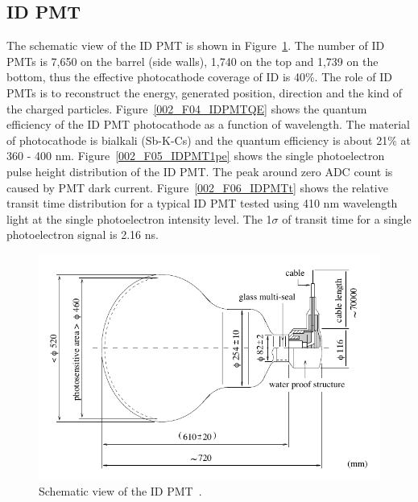\subsection{ID PMT}
\vs\hs The schematic view of the ID PMT is shown in Figure~\ref{002_F03_IDPMT}.
The number of ID PMTs is 7,650 on the barrel (side walls), 1,740 on the top and 1,739 on the bottom, thus the effective photocathode coverage of ID is 40\%.
The role of ID PMTs is to reconstruct the energy, generated position, direction and the kind of the charged particles.
Figure~\ref{002_F04_IDPMTQE} shows the quantum efficiency of the ID PMT photocathode as a function of wavelength.
The material of photocathode is bialkali (Sb-K-Cs) and the quantum efficiency is about 21\% at 360 - 400 nm.
Figure~\ref{002_F05_IDPMT1pe} shows the single photoelectron pulse height distribution of the ID PMT.
The peak around zero ADC count is caused by PMT dark current.
Figure~\ref{002_F06_IDPMTt} shows the relative transit time distribution for a typical ID PMT tested using 410 nm wavelength light at the single photoelectron intensity level.
The 1$\sigma$ of transit time for a single photoelectron signal is 2.16 ns.

\begin{figure}[tbp]
	\centering
	\includegraphics[width=12cm]{Figures/002/F03_IDPMT}
	\caption[Schematic view of the ID PMT]{\label{002_F03_IDPMT} Schematic view of the ID PMT~\cite{2003Fukuda}.}
\end{figure}

